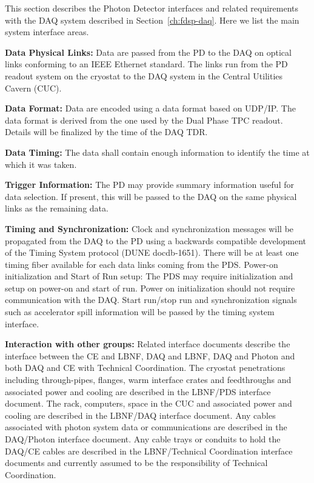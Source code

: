 

This section describes the Photon Detector interfaces and related requirements with the DAQ system described in Section~\ref{ch:fdsp-daq}. Here we list the main system interface areas.


\textbf{Data Physical Links: }Data are passed from the PD to the DAQ on optical links conforming to an IEEE Ethernet standard. The links run from the PD readout system on the cryostat to the DAQ system in the Central Utilities Cavern (CUC).

\textbf{Data Format:} Data are encoded using a data format based on UDP/IP. The data format is derived from the one used by the Dual Phase TPC readout. Details will be finalized by the time of the DAQ TDR.

\textbf{Data Timing:} The data shall contain enough information to identify the time  at which it was taken.

\textbf{Trigger Information:} The PD may provide summary information useful for data selection. If present, this will be passed to the DAQ on the same physical links as the remaining data.

\textbf{Timing and Synchronization: }Clock and synchronization messages will be propagated from the DAQ to the PD using a backwards compatible development of the  Timing System protocol (DUNE docdb-1651). There will be at least one timing fiber available for each data links coming from the PDS. Power-on initialization and Start of Run setup:  The PDS may require initialization and setup on power-on and start of run. Power on initialization should not require communication with the DAQ. Start run/stop run and synchronization signals such as accelerator spill information will be passed by the timing system interface.

\textbf{Interaction with other groups: }Related interface documents describe the interface between the CE and LBNF, DAQ and LBNF, DAQ and Photon and both DAQ and CE with Technical Coordination. The cryostat penetrations including through-pipes, flanges, warm interface crates and feedthroughs and associated power and cooling are described in the LBNF/PDS interface document.  The rack, computers, space in the CUC and associated power and cooling are described in the LBNF/DAQ interface document. Any cables associated with photon system data or communications are described in the DAQ/Photon interface document. Any cable trays or conduits to hold the DAQ/CE cables are described in the LBNF/Technical Coordination interface documents and currently assumed to be the responsibility of Technical Coordination.

